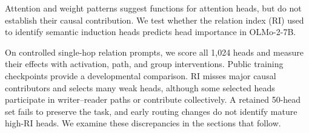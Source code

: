 Attention and weight patterns suggest functions for attention heads, but do not establish their causal contribution. We test whether the relation index (RI) used to identify semantic induction heads \citep{ren2024semantic} predicts head importance in OLMo-2-7B.

On controlled single-hop relation prompts, we score all 1,024 heads and measure their effects with activation, path, and group interventions. Public training checkpoints provide a developmental comparison. RI misses major causal contributors and selects many weak heads, although some selected heads participate in writer–reader paths or contribute collectively. A retained 50-head set fails to preserve the task, and early routing changes do not identify mature high-RI heads. We examine these discrepancies in the sections that follow.